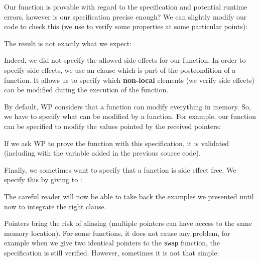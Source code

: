 

Our  function is provable with regard to the specification
and potential runtime errors, however is our specification precise enough? We
can slightly modify our code to check this (we use  to
verify some properties at some particular points):






The result is not exactly what we expect:





Indeed, we did not specify the allowed side effects for our function. In
order to specify side effects, we use an  clause which is
part of the postcondition of a function. It allows us to specify which
\textbf{non-local} elements (we verify side effects) can be modified
during the execution of the function.



By default, WP considers that a function can modify everything in
memory. So, we have to specify what can be modified by a function. For
example, our  function can be specified to modify the
values pointed by the received pointers:






If we ask WP to prove the function with this specification, it is
validated (including with the variable added in the previous source
code).



Finally, we sometimes want to specify that a function is side effect
free. We specify this by giving  to
:






The careful reader will now be able to take back the examples we
presented until now to integrate the right  clause.





Pointers bring the risk of aliasing (multiple pointers can have access
to the same memory location). For some functions, it does not cause any
problem, for example when we give two identical pointers to the
\texttt{swap} function, the specification is still verified. However,
sometimes it is not that simple:




